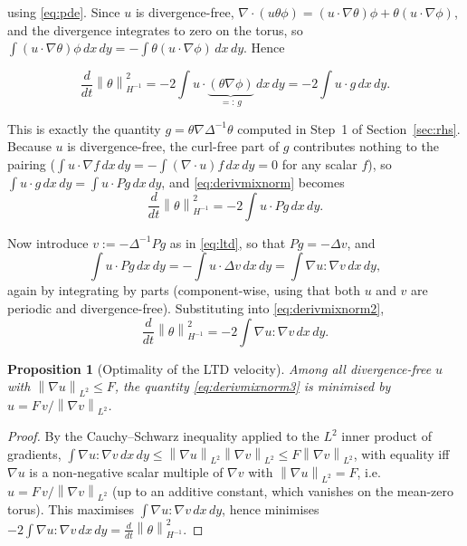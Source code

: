 \documentclass[12pt,a4paper]{article}
\newcommand{\norm}[1]{\left\lVert#1\right\rVert}
\newcommand{\Lap}{\Delta}
\newcommand{\lapinv}{\Delta^{-1}}
\newcommand{\Proj}{P}
\newcommand{\dx}{\,dx\,dy}
\theoremstyle{definition}
\theoremstyle{plain}
\newtheorem{proposition}{Proposition}
\begin{document}
using \eqref{eq:pde}. Since $u$ is divergence-free, $\nabla\cdot(u\theta\phi)
= (u\cdot\nabla\theta)\phi + \theta(u\cdot\nabla\phi)$, and the divergence
integrates to zero on the torus, so $\int(u\cdot\nabla\theta)\phi\dx =
-\int\theta(u\cdot\nabla\phi)\dx$. Hence

\begin{equation}
  \label{eq:derivmixnorm}
  \frac{d}{dt}\norm{\theta}_{H^{-1}}^2
  = -2\int u\cdot\underbrace{(\theta\nabla\phi)}_{=:\,g}\dx
  = -2\int u\cdot g \dx.
\end{equation}

This is exactly the quantity $g=\theta\nabla\lapinv\theta$ computed in
Step~1 of Section~\ref{sec:rhs}. Because $u$ is divergence-free, the
curl-free part of $g$ contributes nothing to the pairing ($\int
u\cdot\nabla f \dx = -\int(\nabla\cdot u)f\dx = 0$ for any scalar $f$), so
$\int u\cdot g\dx = \int u\cdot\Proj g\dx$, and \eqref{eq:derivmixnorm}
becomes
\begin{equation}
  \label{eq:derivmixnorm2}
  \frac{d}{dt}\norm{\theta}_{H^{-1}}^2 = -2\int u\cdot\Proj g\dx.
\end{equation}

Now introduce $v := -\lapinv\Proj g$ as in \eqref{eq:ltd}, so that
$\Proj g = -\Lap v$, and
\begin{equation}
  \int u\cdot\Proj g\dx = -\int u\cdot\Lap v\dx
  = \int \nabla u : \nabla v \dx,
\end{equation}
again by integrating by parts (component-wise, using that both $u$ and $v$
are periodic and divergence-free). Substituting into
\eqref{eq:derivmixnorm2},
\begin{equation}
  \label{eq:derivmixnorm3}
  \frac{d}{dt}\norm{\theta}_{H^{-1}}^2 = -2\int \nabla u : \nabla v \dx.
\end{equation}

\begin{proposition}[Optimality of the LTD velocity]
\label{prop:ltd}
Among all divergence-free $u$ with $\norm{\nabla u}_{L^2}\le F$, the
quantity \eqref{eq:derivmixnorm3} is minimised by
$u = F\,v/\norm{\nabla v}_{L^2}$.
\end{proposition}
\begin{proof}
By the Cauchy--Schwarz inequality applied to the $L^2$ inner product of
gradients, $\int\nabla u:\nabla v\dx \le \norm{\nabla u}_{L^2}
\norm{\nabla v}_{L^2} \le F\norm{\nabla v}_{L^2}$, with equality iff $\nabla
u$ is a non-negative scalar multiple of $\nabla v$ with
$\norm{\nabla u}_{L^2}=F$, i.e.\ $u = F\,v/\norm{\nabla v}_{L^2}$ (up to an
additive constant, which vanishes on the mean-zero torus). This maximises
$\int\nabla u:\nabla v\dx$, hence minimises
$-2\int\nabla u:\nabla v\dx = \frac{d}{dt}\norm{\theta}_{H^{-1}}^2$.
\end{proof}
\end{document}
